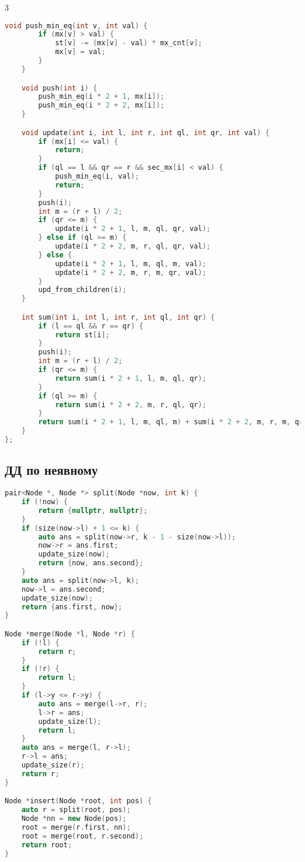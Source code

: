 \documentclass[10pt,a4paper,landscape,twosided]{extarticle}
\begin{document}
\begin{multicols*}{3}
\begin{lstlisting}[language=C++]
    void push_min_eq(int v, int val) {
        if (mx[v] > val) {
            st[v] -= (mx[v] - val) * mx_cnt[v];
            mx[v] = val;
        }
    }

    void push(int i) {
        push_min_eq(i * 2 + 1, mx[i]);
        push_min_eq(i * 2 + 2, mx[i]);
    }

    void update(int i, int l, int r, int ql, int qr, int val) {
        if (mx[i] <= val) {
            return;
        }
        if (ql == l && qr == r && sec_mx[i] < val) {
            push_min_eq(i, val);
            return;
        }
        push(i);
        int m = (r + l) / 2;
        if (qr <= m) {
            update(i * 2 + 1, l, m, ql, qr, val);
        } else if (ql >= m) {
            update(i * 2 + 2, m, r, ql, qr, val);
        } else {
            update(i * 2 + 1, l, m, ql, m, val);
            update(i * 2 + 2, m, r, m, qr, val);
        }
        upd_from_children(i);
    }

    int sum(int i, int l, int r, int ql, int qr) {
        if (l == ql && r == qr) {
            return st[i];
        }
        push(i);
        int m = (r + l) / 2;
        if (qr <= m) {
            return sum(i * 2 + 1, l, m, ql, qr);
        }
        if (ql >= m) {
            return sum(i * 2 + 2, m, r, ql, qr);
        }
        return sum(i * 2 + 1, l, m, ql, m) + sum(i * 2 + 2, m, r, m, qr);
    }
};
\end{lstlisting}

\subsection{ДД по неявному}
\begin{lstlisting}[language=C++]
pair<Node *, Node *> split(Node *now, int k) {
    if (!now) {
        return {nullptr, nullptr};
    }
    if (size(now->l) + 1 <= k) {
        auto ans = split(now->r, k - 1 - size(now->l));
        now->r = ans.first;
        update_size(now);
        return {now, ans.second};
    }
    auto ans = split(now->l, k);
    now->l = ans.second;
    update_size(now);
    return {ans.first, now};
}

Node *merge(Node *l, Node *r) {
    if (!l) {
        return r;
    }
    if (!r) {
        return l;
    }
    if (l->y <= r->y) {
        auto ans = merge(l->r, r);
        l->r = ans;
        update_size(l);
        return l;
    }
    auto ans = merge(l, r->l);
    r->l = ans;
    update_size(r);
    return r;
}

Node *insert(Node *root, int pos) {
    auto r = split(root, pos);
    Node *nn = new Node(pos);
    root = merge(r.first, nn);
    root = merge(root, r.second);
    return root;
}


\end{lstlisting}
\end{multicols*}
\end{document}
